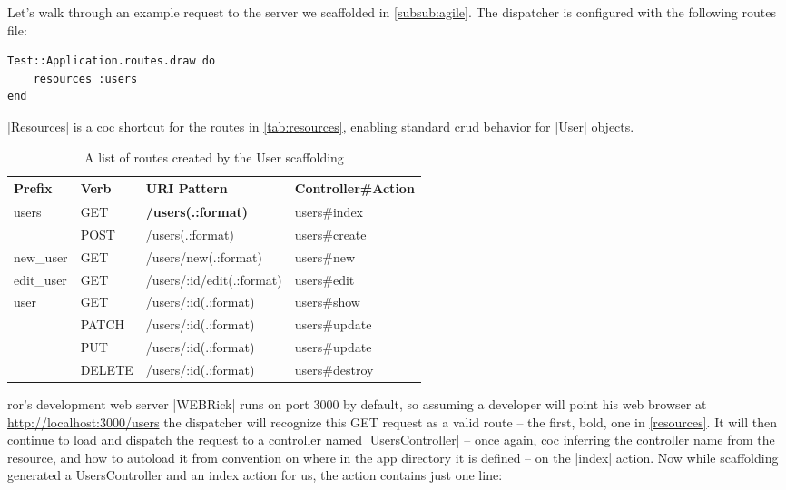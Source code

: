 Let's walk through an example request to the server we scaffolded in \autoref{subsub:agile}. The dispatcher is configured with the following routes file:
 
\begin{lstlisting}[escapechar=!]
Test::Application.routes.draw do
    resources :users
end
\end{lstlisting}

|Resources| is a \gls{coc} shortcut for the routes in \autoref{tab:resources}, enabling standard \gls{crud} behavior for |User| objects.

\begin{table}
\centering
\begin{tabular*}{\textwidth}{@{}@{\extracolsep{\fill}}llll@{}}
  \toprule
   Prefix & Verb & URI Pattern & Controller\#Action \\
  \midrule
      users  & GET    & \textbf{/users(.:format)} & users\#index     \\
  \phantom{} & POST   & /users(.:format)          & users\#create    \\
   new\_user  & GET    & /users/new(.:format)      & users\#new     \\
  edit\_user  & GET    & /users/:id/edit(.:format) & users\#edit    \\
       user  & GET    & /users/:id(.:format)      & users\#show    \\
  \phantom{} & PATCH  & /users/:id(.:format)      & users\#update    \\
  \phantom{} & PUT    & /users/:id(.:format)      & users\#update    \\
  \phantom{} & DELETE & /users/:id(.:format)      & users\#destroy  \\
  \bottomrule
\end{tabular*}
\caption{A list of routes created by the User scaffolding}
\label{tab:resources}
\end{table}

\gls{ror}'s development web server |WEBRick| runs on port 3000 by default, so assuming a developer will point his web browser at \url{http://localhost:3000/users} the dispatcher will recognize this GET request as a valid route -- the first, bold, one in \autoref{resources}.
It will then continue to load and dispatch the request to a controller named |UsersController| -- once again, \gls{coc} inferring the controller name from the resource, and how to autoload it from convention on where in the app directory it is defined -- on the |index| action. Now while scaffolding generated a UsersController and an index action for us, the action contains just one line:

